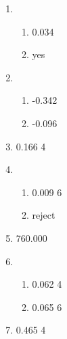 \documentclass[12pt]{article}
\newcommand{\exnum}[9]{
  #1#2#3#4#5#6.#7#8#9\ignorespaces%
}
\newcommand{\exstring}[1]{
  #1%
}
\begin{document}
\begin{enumerate}









\end{enumerate}

\newpage

\begin{enumerate}
  \item 
   \begin{enumerate}
      \item \exnum{ }{ }{ }{ }{ }{0}{0}{3}{4}
      \item \exstring{yes} 
  \end{enumerate}
  \item 
   \begin{enumerate}
      \item \exnum{ }{ }{ }{ }{-}{0}{3}{4}{2}
      \item \exnum{ }{ }{ }{ }{-}{0}{0}{9}{6} 
  \end{enumerate}
  \item \exnum{ }{ }{ }{ }{ }{0}{1}{6}{6}{4}
  \item 
   \begin{enumerate}
      \item \exnum{ }{ }{ }{ }{ }{0}{0}{0}{9}{6}
      \item \exstring{reject} 
  \end{enumerate}
  \item \exnum{ }{ }{ }{7}{6}{0}{0}{0}{0}
  \item 
   \begin{enumerate}
      \item \exnum{ }{ }{ }{ }{ }{0}{0}{6}{2}{4}
      \item \exnum{ }{ }{ }{ }{ }{0}{0}{6}{5}{6} 
  \end{enumerate}
  \item \exnum{ }{ }{ }{ }{ }{0}{4}{6}{5}{4}
\end{enumerate}
\end{document}
